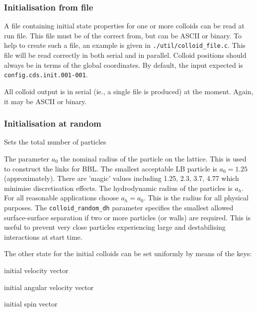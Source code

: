 \subsubsection{Initialisation from file}

A file containing initial state properties for one or more colloids
can be read at run file. This file must be of the correct from, but
can be ASCII or binary. To help to create such a file, an example
is given in \texttt{./util/colloid\_file.c}. This file will be
read correctly in both serial and in parallel. Colloid positions
should always be in terms of the global coordinates. By default,
the input expected is \texttt{config.cds.init.001-001}.

All colloid output is in serial (ie., a single file is produced)
at the moment. Again, it may be ASCII or binary.

\subsubsection{Initialisation at random}

 Sets the total number of particles




The parameter $a_0$ the nominal radius of the particle on the lattice.
This is used to construct the links for BBL. The smallest acceptable LB
particle is $a_0 = 1.25$ (approximately). There are 'magic' values
including 1.25, 2.3, 3.7, 4.77 which minimise discretisation effects.
The hydrodynamic radius of the particles is $a_h$. For all
reasonable applications choose $a_h = a_0$. This is the radius for
all physical purposes. The \texttt{colloid\_random\_dh} parameter
specifies the smallest allowed surface-surface separation if two or
more particles (or walls) are required. This is useful to prevent
very close particles experiencing large and destabilising interactions
at start time.

The other state for the initial colloids can be set uniformly by
means of the keys:

 initial velocity vector

 initial angular velocity vector

 initial spin vector

